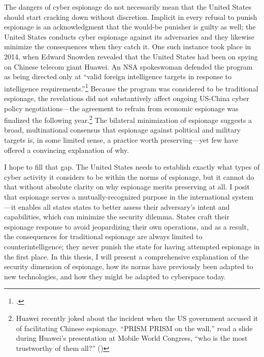 \documentclass[11pt]{memoir}
\begin{document}
\begin{refsegment}
The dangers of cyber espionage do not necessarily mean that the United States should start cracking down without discretion. Implicit in every refusal to punish espionage is an acknowledgment that the would-be punisher is guilty as well; the United States conducts cyber espionage against its adversaries and they likewise minimize the consequences when they catch it. One such instance took place in 2014, when Edward Snowden revealed that the United States had been on spying on Chinese telecom giant Huawei. An NSA spokeswoman defended the program as being directed only at ``valid foreign intelligence targets in response to intelligence requirements.''\footcite{nakashima_nsa_2014} Because the program was considered to be traditional espionage, the revelations did not substantively affect ongoing US-China cyber policy negotiations---the agreement to refrain from economic espionage was finalized the following year.\footnote{Huawei recently joked about the incident when the US government accused it of facilitating Chinese espionage. ``PRISM PRISM on the wall,'' read a slide during Huawei's presentation at Mobile World Congress, ``who is the most trustworthy of them all?'' (\cite{nicola_huawei_2019})} The bilateral minimization of espionage suggests a broad, multinational consensus that espionage against political and military targets is, in some limited sense, a practice worth preserving---yet few have offered a convincing explanation of why.


I hope to fill that gap. The United States needs to establish exactly what types of cyber activity it considers to be within the norms of espionage, but it cannot do that without absolute clarity on why espionage merits preserving at all. I posit that espionage serves a mutually-recognized purpose in the international system---it enables all states states to better assess their adversary's intent and capabilities, which can minimize the security dilemma. States craft their espionage response to avoid jeopardizing their own operations, and as a result, the consequences for traditional espionage are always limited to counterintelligence; they never punish the state for having attempted espionage in the first place. In this thesis, I will present a comprehensive explanation of the security dimension of espionage, how its norms have previously been adapted to new technologies, and how they might be adapted to cyberspace today.


\end{refsegment}
\end{document}
